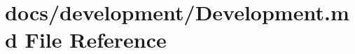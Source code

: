 \hypertarget{Development_8md}{\section{docs/development/\+Development.md File Reference}
\label{Development_8md}
}
